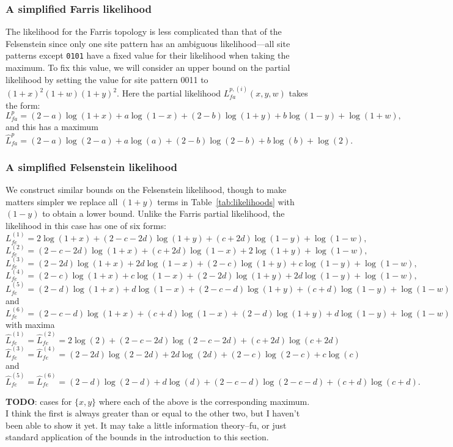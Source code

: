 \documentclass[a4paper]{article}
\begin{document}
\subsubsection{A simplified Farris likelihood}

The likelihood for the Farris topology is less complicated than that of the Felsenstein since only one site pattern has an ambiguous likelihood---all site patterns except \texttt{0101} have a fixed value for their likelihood when taking the maximum.
To fix this value, we will consider an upper bound on the partial likelihood by setting the value for site pattern 0011 to $(1+x)^2(1+w)(1+y)^2$.
Here the partial likelihood $L_{fa}^{p,(i)}(x,y,w)$ takes the form:
$$
L_{fa}^{p} = (2-a)\log(1+x)+a\log(1-x)+(2-b)\log(1+y)+b\log(1-y)+\log(1+w),
$$
and this has a maximum
$$
\hat{L}_{fa}^{p} = (2-a)\log(2-a)+a\log(a)+(2-b)\log(2-b)+b\log(b)+\log(2).
$$

\subsubsection{A simplified Felsenstein likelihood}

We construct similar bounds on the Felsenstein likelihood, though to make matters simpler we replace all $(1+y)$ terms in Table~\ref{tab:likelihoods} with $(1-y)$ to obtain a lower bound.
Unlike the Farris partial likelihood, the likelihood in this case has one of six forms:
$$
L_{fe}^{(1)} = 2\log(1+x)+(2-c-2d)\log(1+y)+(c+2d)\log(1-y)+\log(1-w),
$$
$$
L_{fe}^{(2)} = (2-c-2d)\log(1+x)+(c+2d)\log(1-x)+2\log(1+y)+\log(1-w),
$$
$$
L_{fe}^{(3)} = (2-2d)\log(1+x)+2d\log(1-x)+(2-c)\log(1+y)+c\log(1-y)+\log(1-w),
$$
$$
L_{fe}^{(4)} = (2-c)\log(1+x)+c\log(1-x)+(2-2d)\log(1+y)+2d\log(1-y)+\log(1-w),
$$
$$
L_{fe}^{(5)} = (2-d)\log(1+x)+d\log(1-x)+(2-c-d)\log(1+y)+(c+d)\log(1-y)+\log(1-w)
$$
and
$$
L_{fe}^{(6)} = (2-c-d)\log(1+x)+(c+d)\log(1-x)+(2-d)\log(1+y)+d\log(1-y)+\log(1-w)
$$
with maxima
$$
\hat{L}_{fe}^{(1)} = \hat{L}_{fe}^{(2)} = 2\log(2)+(2-c-2d)\log(2-c-2d)+(c+2d)\log(c+2d)
$$
$$
\hat{L}_{fe}^{(3)} = \hat{L}_{fe}^{(4)} = (2-2d)\log(2-2d)+2d\log(2d)+(2-c)\log(2-c)+c\log(c)
$$
and
$$
\hat{L}_{fe}^{(5)} = \hat{L}_{fe}^{(6)} = (2-d)\log(2-d)+d\log(d)+(2-c-d)\log(2-c-d)+(c+d)\log(c+d).
$$

\textbf{TODO}: cases for $\{x, y\}$ where each of the above is the corresponding maximum.
I think the first is always greater than or equal to the other two, but I haven't been able to show it yet.
It may take a little information theory--fu, or just standard application of the bounds in the introduction to this section.
\end{document}
